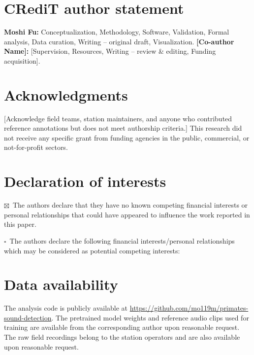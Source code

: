 \documentclass[review,3p,times]{elsarticle}
\begin{document}
\section*{CRediT author statement}

\textbf{Moshi Fu:} Conceptualization, Methodology, Software, Validation,
Formal analysis, Data curation, Writing -- original draft, Visualization.
\textbf{[Co-author Name]:} [Supervision, Resources, Writing -- review \&
editing, Funding acquisition].

\section*{Acknowledgments}

[Acknowledge field teams, station maintainers, and anyone who contributed
reference annotations but does not meet authorship criteria.] This research did
not receive any specific grant from funding agencies in the public,
commercial, or not-for-profit sectors.

\section*{Declaration of interests}

\noindent$\boxtimes$~The authors declare that they have no known competing
financial interests or personal relationships that could have appeared to
influence the work reported in this paper.

\medskip
\noindent$\square$~The authors declare the following financial
interests/personal relationships which may be considered as potential
competing interests:

\section*{Data availability}

The analysis code is publicly available at
\url{https://github.com/mo119m/primates-sound-detection}. The pretrained
model weights and reference audio clips used for training are available from
the corresponding author upon reasonable request. The raw field recordings
belong to the station operators and are also available upon reasonable
request.
\end{document}

